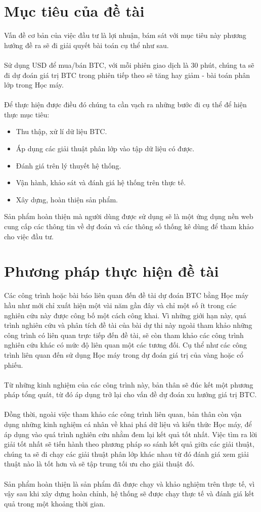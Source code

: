 \section{Mục tiêu của đề tài}
Vấn đề cơ bản của việc đầu tư là lợi nhuận, bám sát với mục tiêu này phương hướng 
đề ra sẽ đi giải quyết bài toán cụ thể như sau.\\\\
Sử dụng USD để mua/bán BTC, với mỗi phiên giao dịch là 30 phút, chúng 
ta sẽ đi dự đoán giá trị BTC trong phiên tiếp theo sẽ tăng hay giảm - bài
toán phân lớp trong Học máy.\\\\
Để thực hiện được điều đó chúng ta cần vạch ra những bước đi cụ
thể để hiện thực mục tiêu:
\begin{itemize}
  \item Thu thập, xử lí dữ liệu BTC.
  \item Áp dụng các giải thuật phân lớp vào tập dữ liệu có được.
  \item Đánh giá trên lý thuyết hệ thống.
  \item Vận hành, khảo sát và đánh giá hệ thống trên thực tế.
  \item Xây dựng, hoàn thiện sản phẩm.
\end{itemize} 
Sản phẩm hoàn thiện mà người dùng được sử dụng sẽ là một ứng dụng nền web cung 
cấp các thông tin về dự đoán và các thông số thống kê dùng để tham khảo cho việc 
đầu tư.
\section{Phương pháp thực hiện đề tài}
Các công trình hoặc bài báo liên quan đến đề tài dự đoán BTC bằng Học máy hầu 
như mới chỉ xuất hiện một vài năm gần đây và chỉ một số ít trong các nghiên cứu 
này được công bố một cách công khai. Vì những giới hạn này, quá trình nghiên 
cứu và phân tích đề tài của bài dự thi này ngoài tham khảo những công trình có 
liên quan trực tiếp đến đề tài, sẽ còn tham khảo các công trình nghiên cứu khác 
có mức độ liên quan một các tương đối. Cụ thể như các công trình liên 
quan đến sử dụng Học máy trong dự đoán giá trị của vàng hoặc cổ phiếu.\\\\
Từ những kinh nghiệm của các công trình này, bản thân sẽ đúc kết một phương pháp tổng 
quát, từ đó áp dụng trở lại cho vấn đề dự đoán xu hướng giá trị BTC.\\\\
Đồng thời, ngoài việc tham khảo các công trình liên quan, bản thân còn vận dụng 
những kinh nghiệm cá nhân về khai phá dữ liệu và kiến thức Học máy, để áp dụng 
vào quá trình nghiên cứu nhằm đem lại kết quả tốt nhất. Việc tìm ra lời giải 
tốt nhất sẽ tiến hành theo phương pháp so sánh kết quả giữa các giải thuật, 
chúng ta sẽ đi chạy các giải thuật phân lớp khác nhau từ đó đánh giá xem giải 
thuật nào là tốt hơn và sẽ tập trung tối ưu cho giải thuật đó.\\\\
Sản phẩm hoàn thiện là sản phẩm đã được chạy và khảo nghiệm trên thực tế, vì vậy 
sau khi xây dựng hoàn chỉnh, hệ thống sẽ được chạy thực tế và đánh giá kết quả 
trong một khoảng thời gian.

